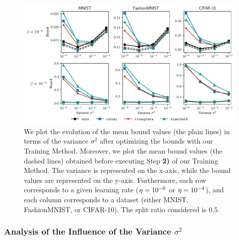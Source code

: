 \begin{figure}[t]
    \centering
    \includegraphics[width=1.0\linewidth]{chapter_6/figures/plot_4_prior_0.5.pdf}
    \caption[Evolution of the Bound Values in Terms of the Variance $\sigma^2$]{
    We plot the evolution of the mean bound values (the plain lines) in terms of the variance $\sigma^2$ after optimizing the bounds with our Training Method.
    Moreover, we plot the mean bound values (the dashed lines) obtained before executing Step {\bf 2)} of our Training Method.
    The variance is represented on the x-axis, while the bound values are represented on the y-axis.  
    Furthermore, each row corresponds to a given learning rate ($\eta=10^{-6}$ or $\eta=10^{-4}$), and each column corresponds to a dataset (either MNIST, FashionMNIST, or CIFAR-10).
    The split ratio considered is $0.5$.
    }
    \label{chap:dis-pra:figure:exp-3}
\end{figure}

\subsubsection{Analysis of the Influence of the Variance $\sigma^2$}

